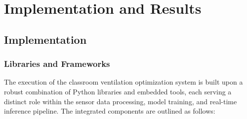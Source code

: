 
\chapter{Implementation and Results}
\section{Implementation}

\subsection{Libraries and Frameworks}
The execution of the classroom ventilation optimization system is built upon a robust combination of Python libraries and embedded tools, each serving a distinct role within the sensor data processing, model training, and real-time inference pipeline. The integrated components are outlined as follows:
